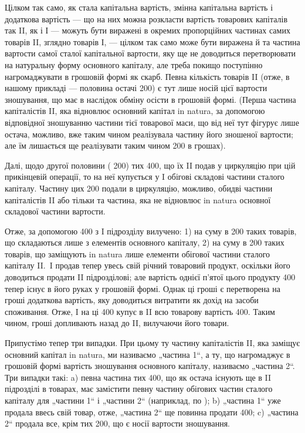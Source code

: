 Цілком так само, як стала капітальна вартість, змінна капітальна вартість
і додаткова вартість — що на них можна розкласти вартість товарових
капіталів так II, як і І — можуть бути виражені в окремих пропорційних
частинах самих товарів II, зглядно товарів І, — цілком так само
може бути виражена й та частина вартости самої сталої капітальної вартости,
яку ще не доводиться перетворювати на натуральну форму основного
капіталу, але треба покищо поступінно нагромаджувати в грошовій
формі як скарб. Певна кількість товарів II (отже, в нашому прикладі —
половина остачі \deq{} 200) є тут лише носій цієї вартости зношування, що
має в наслідок обміну осісти в грошовій формі. (Перша частина капіталістів
II, яка відновлює основний капітал in natura, за допомогою відповідної
зношуванню частини тієї товарової маси, що від неї тут фігурує
лише остача, можливо, вже таким чином реалізувала частину його зношеної
вартости; але їм лишається ще реалізувати таким чином
200 в грошах).

Далі, щодо другої половини (\deq{} 200) тих 400, що їх II
подав у циркуляцію при цій прикінцевій операції, то на неї купується
у I обігові складові частини сталого капіталу. Частину цих 200
подали в циркуляцію, можливо, обидві частини капіталістів II або тільки
та частина, яка не відновлює in natura основної складової частини
вартости.

Отже, за допомогою 400 з I підрозділу вилучено: 1) на
суму в 200 таких товарів, що складаються лише з елементів
основного капіталу, 2) на суму в 200 таких товарів, що заміщують
in natura лише елементи обігової частини сталого капіталу II.~I продав тепер увесь свій річний товаровий продукт, оскільки його доводиться
продати II підрозділові; але вартість однієї п’ятої цього продукту
400 тепер існує в його руках у грошовій формі. Однак ці
гроші є перетворена на гроші додаткова вартість, яку доводиться витратити
як дохід на засоби споживання. Отже, I на ці 400 купує
в II всю товарову вартість \deq{} 400. Таким чином, гроші допливають назад
до II, вилучаючи його товари.

Припустімо тепер три випадки. При цьому ту частину капіталістів II,
яка заміщує основний капітал in natura, ми називаємо „частина 1“, а
ту, що нагромаджує в грошовій формі вартість зношування основного
капіталу, називаємо „частина 2“. Три випадки такі: a) певна частина тих
400, що як остача існують ще в II підрозділі в товарах, має замістити певну
частину обігових частин сталого капіталу для „частини 1“ і „частини 2“
(наприклад, по ); b) „частина 1“ уже продала ввесь свій товар, отже,
„частина 2“ ще повинна продати 400; c) „частина 2“ продала все, крім
тих 200, що є носії вартости зношування.

